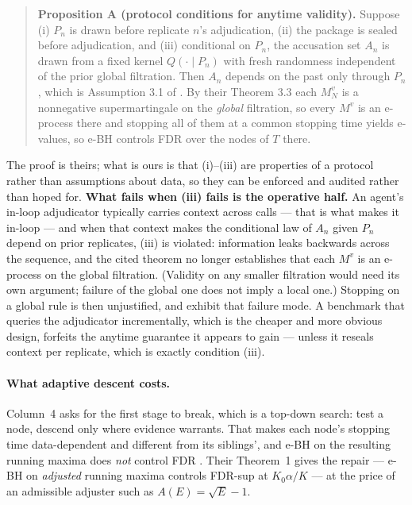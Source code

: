 \documentclass[10pt]{article}
\begin{document}
\begin{quote}
\textbf{Proposition A (protocol conditions for anytime validity).} Suppose
(i) $P_n$ is drawn before replicate $n$'s adjudication, (ii) the package is
sealed before adjudication, and (iii) conditional on $P_n$, the accusation set
$A_n$ is drawn from a fixed kernel $Q(\cdot\mid P_n)$ with fresh randomness
independent of the prior global filtration. Then $A_n$ depends on the past only
through $P_n$, which is Assumption 3.1 of \cite{stoppedebh}. By their Theorem 3.3 each $M^v_N$ is a
nonnegative supermartingale on the \emph{global} filtration, so every $M^v$ is
an e-process there and stopping all of them at a common stopping time yields
e-values, so e-BH controls FDR over the nodes of $T$ there.
\end{quote}

\noindent The proof is theirs; what is ours is that (i)--(iii) are properties of
a protocol rather than assumptions about data, so they can be enforced and
audited rather than hoped for. \textbf{What fails when (iii) fails is the
operative half.} An agent's in-loop adjudicator typically carries context across
calls --- that is what makes it in-loop --- and when that context makes the
conditional law of $A_n$ given $P_n$ depend on prior replicates, (iii) is
violated: information leaks backwards across the sequence, and the cited theorem
no longer establishes that each $M^v$ is an e-process on the global filtration.
(Validity on any smaller filtration would need its own argument; failure of the
global one does not imply a local one.) Stopping on a global rule is then
unjustified, and \cite{stoppedebh} exhibit that failure mode. A benchmark that
queries the adjudicator incrementally, which is the cheaper and more obvious
design, forfeits the anytime guarantee it appears to gain --- unless it reseals
context per replicate, which is exactly condition (iii).

\paragraph{What adaptive descent costs.} Column~4 asks for the first stage to
break, which is a top-down search: test a node, descend only where evidence
warrants. That makes each node's stopping time data-dependent and different from
its siblings', and e-BH on the resulting running maxima does \emph{not} control
FDR \cite{carefree}. Their Theorem~1 gives the repair --- e-BH on
\emph{adjusted} running maxima controls FDR-sup at $K_0\alpha/K$ --- at the
price of an admissible adjuster such as $A(E)=\sqrt{E}-1$.
\end{document}
